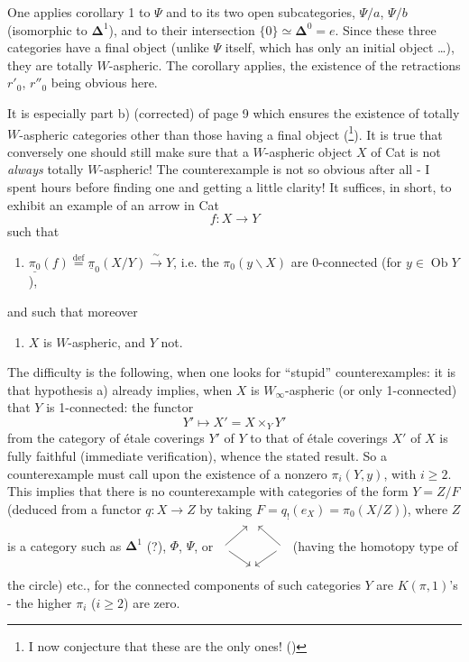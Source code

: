 \documentclass[11pt]{article}
\newcommand{\printedpage}[1]{\marginpar{\footnotesize p.~#1}}
\newcommand{\msp}[1]{\marginpar{\footnotesize [#1]}}
\newcommand{\upi}{\underline{\pi}}
\newcommand{\Ob}{\operatorname{Ob}}
\newcommand{\bDelta}{\boldsymbol{\Delta}}
\begin{document}
One applies corollary 1 to $\Psi$ and to its two open subcategories, $\Psi/a$, $\Psi/b$ (isomorphic to $\bDelta^1$), and to their intersection $\{0\} \simeq \bDelta^0 = e$. Since these three categories have a final object (unlike $\Psi$ itself, which has only an initial object \dots), they are totally $W$-aspheric. The corollary applies, the existence of the retractions $r'_0$, $r''_0$ being obvious here.

It is especially part b) (corrected) of page 9 which ensures the existence of totally $W$-aspheric categories other than those having a final object (\footnote{I now conjecture that these are the only ones! (\footnotemark)}). It is true that conversely one should still make sure that a $W$-aspheric object $X$ of Cat is not \textit{always} totally $W$-aspheric! The counterexample is not so obvious after all -
\msp{page 101}
I spent hours before finding one and getting a little clarity! It suffices, in short, to exhibit an example of an arrow in Cat
\[
f : X \longrightarrow Y
\]
such that
\printedpage{71}
\begin{enumerate}[label=\alph*)]
\item $\underline{\pi_0}(f) \overset{\text{def}}{=} \upi_0(X/Y) \xrightarrow{\ \sim\ } Y$, i.e. the $\pi_0(y\backslash X)$ are 0-connected (for $y \in \Ob Y$),
\end{enumerate}

and such that moreover

\begin{enumerate}[label=\alph*), start=2]
\item $X$ is $W$-aspheric, and $Y$ not.
\end{enumerate}

The difficulty is the following, when one looks for ``stupid'' counterexamples: it is that hypothesis a) already implies, when $X$ is $W_\infty$-aspheric (or only 1-connected) that $Y$ is 1-connected: the functor
\[
Y' \longmapsto X' = X \times_Y Y'
\]
from the category of étale coverings $Y'$ of $Y$ to that of étale coverings $X'$ of $X$ is fully faithful (immediate verification), whence the stated result. So a counterexample must call upon the existence of a nonzero $\pi_i(Y,y)$, with $i \geq 2$. This implies
\msp{page 102}
that there is no counterexample with categories of the form $Y = Z/F$ (deduced from a functor $q : X \longrightarrow Z$ by taking $F = q_!(e_X) = \pi_0(X/Z)$), where $Z$ is a category such as $\bDelta^1$ (?), $\Phi$, $\Psi$, or $\begin{tikzcd}[ampersand replacement=\&, sep=small, baseline=(M.base)]
 \& {} \& \\
{} \arrow[ur] \arrow[dr] \& |[alias=M]| \phantom{x} \& {} \arrow[ul] \arrow[dl] \\
 \& {} \&
\end{tikzcd}$ (having the homotopy type of the circle) etc., for the connected components of such categories $Y$ are $K(\pi,1)$'s - the higher $\pi_i$ ($i \geq 2$) are zero.
\end{document}
